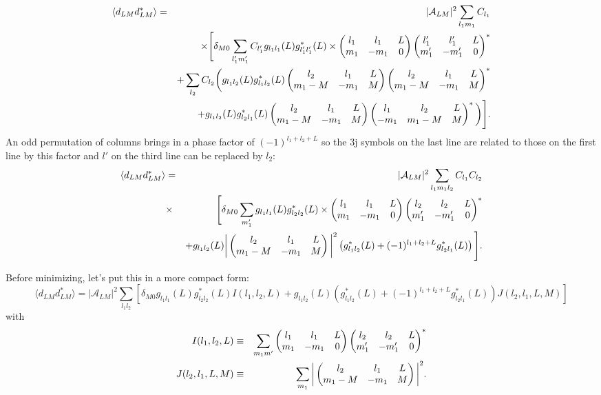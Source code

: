 \documentclass[prd,amsmath,amssymb,floatfix,superscriptaddress,nofootinbib,preprintnumbers]{revtex4-1}
\def\be{\begin{equation}}
\def\ee{\end{equation}}
\def\bea{\begin{eqnarray}}
\def\eea{\end{eqnarray}}
\newcommand{\vs}{\nonumber\\}
\begin{document}
  \bea
 \langle d_{LM} d^*_{LM} \rangle &=& \vert \mathcal{A}_{LM}\vert^2
 \sum_{l_1m_1} C_{l_1}
 \vs
 &&\times 
\Bigg[ \delta_{M0}\sum_{ l_1'm_1'}  C_{l_1'} g_{l_1l_1}(L)  g^*_{l_1'l_1'}(L) 
\times \left(\begin{matrix} l_1 & l_1 &L\cr m_1&-m_1&0\end{matrix}\right)
 \left(\begin{matrix} l_1' & l_1' &L\cr m_1'&-m_1'&0\end{matrix}\right)^*\vs
 &&+ \sum_{l_2}  C_{l_2}  \bigg( g_{l_1l_2}(L)  g^*_{l_1l_2}(L)  \left(\begin{matrix} l_2 & l_1 &L\cr m_1-M&-m_1&M\end{matrix}\right)
 \left(\begin{matrix} l_2 & l_1 &L\cr m_1-M&-m_1&M\end{matrix}\right)^* 
 \vs
 &&+ g_{l_1l_2}(L)  g^*_{l_2l_1}(L)  \left(\begin{matrix} l_2 & l_1 &L\cr m_1-M&-m_1&M\end{matrix}\right)
 \left(\begin{matrix} l_1 & l_2 &L\cr -m_1&m_1-M&M\end{matrix}\right)^* 
\bigg) \Bigg].
  \eea 
An odd permutation of columns brings in a phase factor of $(-1)^{l_1+l_2+L}$ so the 3j symbols on the last line are related to those on the first line by this factor and $l'$ on the third line can be replaced by $l_2$:
 \bea
 \langle d_{LM} d^*_{LM} \rangle &=& \vert \mathcal{A}_{LM}\vert^2
 \sum_{l_1m_1l_2} C_{l_1} C_{l_2}  
 \vs
 &\times &
\Bigg[ \delta_{M0}\sum_{ m_1'}  g_{l_1l_1}(L)  g^*_{l_2l_2}(L) 
\times \left(\begin{matrix} l_1 & l_1 &L\cr m_1&-m_1&0\end{matrix}\right)
 \left(\begin{matrix} l_2& l_2 &L\cr m_1'&-m_1'&0\end{matrix}\right)^*\vs
 &&+ g_{l_1l_2}(L)  \bigg\vert\left(\begin{matrix} l_2 & l_1 &L\cr m_1-M&-m_1&M\end{matrix}\right)\bigg\vert^2
  \left( g^*_{l_1l_2}(L)  + (-1)^{l_1+l_2+L}g^*_{l_2l_1}(L) \right)
  \Bigg].
  \eea 

Before minimizing, let's put this in a more compact form:
\be  
  \langle d_{LM} d^*_{LM} \rangle 
  = \vert \mathcal{A}_{LM}\vert^2 \sum_{l_1l_2}
  \left[ \delta_{M0} g_{l_1l_1}(L)  g^*_{l_2l_2}(L) I(l_1,l_2,L)
  + g_{l_1l_2}(L)   \left( g^*_{l_1l_2}(L)  + (-1)^{l_1+l_2+L}g^*_{l_2l_1}(L) \right) J(l_2,l_1,L,M)
  \right]
 \ee 
 with
 \bea
 I(l_1,l_2,L) &\equiv& \sum_{m_1m'} \left(\begin{matrix} l_1 & l_1 &L\cr m_1&-m_1&0\end{matrix}\right)
 \left(\begin{matrix} l_2& l_2 &L\cr m_1'&-m_1'&0\end{matrix}\right)^*
 \vs
 J(l_2,l_1,L,M) &\equiv&\sum_{m_1} \bigg\vert\left(\begin{matrix} l_2 & l_1 &L\cr m_1-M&-m_1&M\end{matrix}\right)\bigg\vert^2
 .\eea
 

\end{document}
